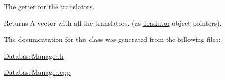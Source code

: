The getter for the translators. 

\begin{DoxyReturn}{Returns}
A vector with all the translators. (as \hyperlink{class_tradutor}{Tradutor} object pointers). 
\end{DoxyReturn}


The documentation for this class was generated from the following files\-:\begin{DoxyCompactItemize}
\item 
\hyperlink{_database_manager_8h}{Database\-Manager.\-h}\item 
\hyperlink{_database_manager_8cpp}{Database\-Manager.\-cpp}\end{DoxyCompactItemize}
